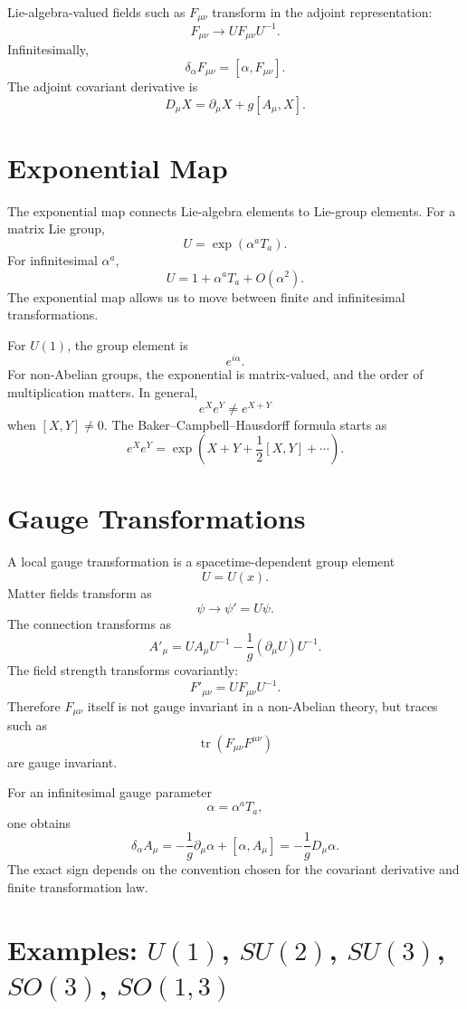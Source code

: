 Lie-algebra-valued fields such as \(F_{\mu\nu}\) transform in the adjoint
representation:
\[
    F_{\mu\nu}\longrightarrow UF_{\mu\nu}U^{-1}.
\]
Infinitesimally,
\[
    \delta_\alpha F_{\mu\nu}=[\alpha,F_{\mu\nu}].
\]
The adjoint covariant derivative is
\[
    D_\mu X=\partial_\mu X+g[A_\mu,X].
\]

\section{Exponential Map}

The exponential map connects Lie-algebra elements to Lie-group elements. For a
matrix Lie group,
\[
    U=\exp(\alpha^aT_a).
\]
For infinitesimal \(\alpha^a\),
\[
    U=1+\alpha^aT_a+O(\alpha^2).
\]
The exponential map allows us to move between finite and infinitesimal
transformations.

For \(U(1)\), the group element is
\[
    e^{i\alpha}.
\]
For non-Abelian groups, the exponential is matrix-valued, and the order of
multiplication matters. In general,
\[
    e^X e^Y\neq e^{X+Y}
\]
when \([X,Y]\neq0\). The Baker--Campbell--Hausdorff formula starts as
\[
    e^X e^Y=\exp\left(X+Y+\frac{1}{2}[X,Y]+\cdots\right).
\]

\section{Gauge Transformations}

A local gauge transformation is a spacetime-dependent group element
\[
    U=U(x).
\]
Matter fields transform as
\[
    \psi\longrightarrow \psi'=U\psi.
\]
The connection transforms as
\[
    A'_\mu=U A_\mu U^{-1}-\frac{1}{g}(\partial_\mu U)U^{-1}.
\]
The field strength transforms covariantly:
\[
    F'_{\mu\nu}=UF_{\mu\nu}U^{-1}.
\]
Therefore \(F_{\mu\nu}\) itself is not gauge invariant in a non-Abelian theory,
but traces such as
\[
    \operatorname{tr}(F_{\mu\nu}F^{\mu\nu})
\]
are gauge invariant.

For an infinitesimal gauge parameter
\[
    \alpha=\alpha^aT_a,
\]
one obtains
\[
    \delta_\alpha A_\mu=-\frac{1}{g}\partial_\mu\alpha+[\alpha,A_\mu]
    =-\frac{1}{g}D_\mu\alpha.
\]
The exact sign depends on the convention chosen for the covariant derivative and
finite transformation law.

\section{Examples: \texorpdfstring{\(U(1)\), \(SU(2)\), \(SU(3)\), \(SO(3)\), \(SO(1,3)\)}{U(1), SU(2), SU(3), SO(3), SO(1,3)}}

